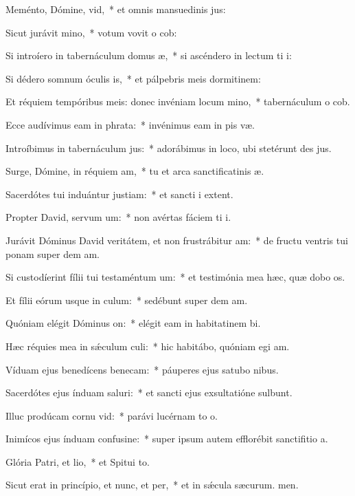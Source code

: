 \item Meménto, Dómine, vid,~* et omnis mansuedinis jus:
\item Sicut jurávit mino,~* votum vovit o cob:
\item Si introíero in tabernáculum domus æ,~* si ascéndero in lectum ti i:
\item Si dédero somnum óculis is,~* et pálpebris meis dormitinem:
\item Et réquiem tempóribus meis: donec invéniam locum mino,~* tabernáculum o cob.
\item Ecce audívimus eam in phrata:~* invénimus eam in pis væ.
\item Introíbimus in tabernáculum jus:~* adorábimus in loco, ubi stetérunt des jus.
\item Surge, Dómine, in réquiem am,~* tu et arca sanctificatinis æ.
\item Sacerdótes tui induántur justiam:~* et sancti i extent.
\item Propter David, servum um:~* non avértas fáciem ti i.
\item Jurávit Dóminus David veritátem, et non frustrábitur am:~* de fructu ventris tui ponam super dem am.
\item Si custodíerint fílii tui testaméntum um:~* et testimónia mea hæc, quæ dobo os.
\item Et fílii eórum usque in culum:~* sedébunt super dem am.
\item Quóniam elégit Dóminus on:~* elégit eam in habitatinem bi.
\item Hæc réquies mea in sǽculum culi:~* hic habitábo, quóniam egi am.
\item Víduam ejus benedícens benecam:~* páuperes ejus satubo nibus.
\item Sacerdótes ejus índuam saluri:~* et sancti ejus exsultatióne sulbunt.
\item Illuc prodúcam cornu vid:~* parávi lucérnam to o.
\item Inimícos ejus índuam confusine:~* super ipsum autem efflorébit sanctifitio a.
\item Glória Patri, et lio,~* et Spitui to.
\item Sicut erat in princípio, et nunc, et per,~* et in sǽcula sæcurum. men.
